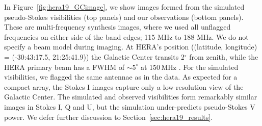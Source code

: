 In Figure~\ref{fig:hera19_GCimage}, we show images formed from the simulated pseudo-Stokes visibilities (top panels) and our observations (bottom panels). These are multi-frequency synthesis images, where we used all unflagged frequencies on either side of the band edges; 115 MHz to 188 MHz. We do not specify a beam model during imaging. At HERA's position ((latitude, longitude) = (-30:43:17.5, 21:25:41.9)) the Galactic Center transits 2$^{\circ}$ from zenith, while the HERA primary beam has a FWHM of $\sim5^{\circ}$ at 150\,MHz \citep{Neben.16}. For the simulated visibilities, we flagged the same antennae as in the data. As expected for a compact array, the Stokes I images capture only a low-resolution view of the Galactic Center. The simulated and observed visibilities form remarkably similar images in Stokes I, Q and U, but the simulation under-predicts pseudo-Stokes V power. We defer further discussion to Section~\ref{sec:hera19_results}.

